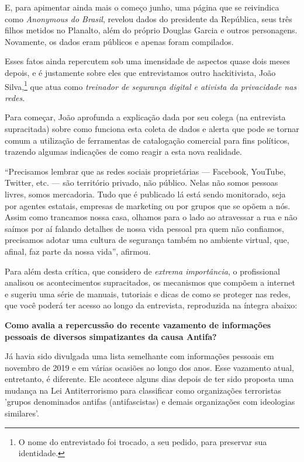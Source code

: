 E, para apimentar ainda mais o começo junho, uma página que se
reivindica como \emph{Anonymous do Brasil}, revelou dados do presidente
da República, seus três filhos metidos no Planalto, além do próprio
Douglas Garcia e outros personagens. Novamente, os dados eram públicos e
apenas foram compilados.

Esses fatos ainda repercutem sob uma imensidade de aspectos quase dois
meses depois, e é justamente sobre eles que entrevistamos outro
hackitivista, João Silva,\footnote{O nome do entrevistado foi trocado, a seu pedido, para preservar sua identidade.} que atua como \emph{treinador de
segurança digital e ativista da privacidade nas redes}.

Para começar, João aprofunda a explicação dada por seu colega (na
entrevista supracitada) sobre como funciona esta coleta de dados e
alerta que pode se tornar comum a utilização de ferramentas de
catalogação comercial para fins políticos, trazendo algumas indicações
de como reagir a esta nova realidade.

``Precisamos lembrar que as redes sociais proprietárias --- Facebook,
YouTube, Twitter, etc. --- são território privado, não público. Nelas não
somos pessoas livres, somos mercadoria. Tudo que é publicado lá está
sendo monitorado, seja por agentes estatais, empresas de marketing ou
por grupos que se opõem a nós. Assim como trancamos nossa casa, olhamos
para o lado ao atravessar a rua e não saímos por aí falando detalhes de
nossa vida pessoal pra quem não confiamos, precisamos adotar uma cultura
de segurança também no ambiente virtual, que, afinal, faz parte da nossa
vida'', afirmou.

Para além desta crítica, que considero de \emph{extrema importância},
o profissional analisou os acontecimentos supracitados, os mecanismos
que compõem a internet e sugeriu uma série de manuais, tutoriais e dicas
de como se proteger nas redes, que você poderá ter acesso ao longo da
entrevista, reproduzida na íntegra abaixo:

\bigskip

\noindent{}\textbf{Como avalia a repercussão do recente vazamento de informações
pessoais de diversos simpatizantes da causa Antifa? }

Já havia sido divulgada uma lista semelhante com
informações pessoais em novembro de 2019 e em várias ocasiões ao longo
dos anos. Esse vazamento atual, entretanto, é diferente. Ele acontece
alguns dias depois de ter sido proposta uma mudança na Lei
Antiterrorismo para classificar como organizações terroristas 'grupos
denominados antifas (antifascistas) e demais organizações com ideologias
similares'.

